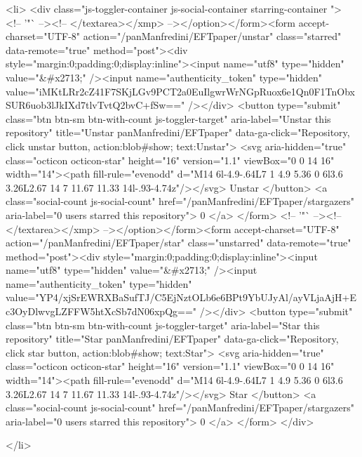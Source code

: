   <li>
      <div class="js-toggler-container js-social-container starring-container ">
    <!-- '"` --><!-- </textarea></xmp> --></option></form><form accept-charset="UTF-8" action="/panManfredini/EFTpaper/unstar" class="starred" data-remote="true" method="post"><div style="margin:0;padding:0;display:inline"><input name="utf8" type="hidden" value="&#x2713;" /><input name="authenticity_token" type="hidden" value="iMKtLRr2cZ41F7SKjLGv9PCT2a0EuIlgwrWrNGpRuox6e1Qn0F1TnObxSUR6uob3lJkIXd7tlvTvtQ2bvC+fSw==" /></div>
      <button
        type="submit"
        class="btn btn-sm btn-with-count js-toggler-target"
        aria-label="Unstar this repository" title="Unstar panManfredini/EFTpaper"
        data-ga-click="Repository, click unstar button, action:blob#show; text:Unstar">
        <svg aria-hidden="true" class="octicon octicon-star" height="16" version="1.1" viewBox="0 0 14 16" width="14"><path fill-rule="evenodd" d="M14 6l-4.9-.64L7 1 4.9 5.36 0 6l3.6 3.26L2.67 14 7 11.67 11.33 14l-.93-4.74z"/></svg>
        Unstar
      </button>
        <a class="social-count js-social-count" href="/panManfredini/EFTpaper/stargazers"
           aria-label="0 users starred this repository">
          0
        </a>
</form>
    <!-- '"` --><!-- </textarea></xmp> --></option></form><form accept-charset="UTF-8" action="/panManfredini/EFTpaper/star" class="unstarred" data-remote="true" method="post"><div style="margin:0;padding:0;display:inline"><input name="utf8" type="hidden" value="&#x2713;" /><input name="authenticity_token" type="hidden" value="YP4/xjSrEWRXBaSufTJ/C5EjNztOLb6e6BPt9YbUJyAl/ayVLjaAjH+Ec3OyDlwvgLZFFW5htXcSb7dN06xpQg==" /></div>
      <button
        type="submit"
        class="btn btn-sm btn-with-count js-toggler-target"
        aria-label="Star this repository" title="Star panManfredini/EFTpaper"
        data-ga-click="Repository, click star button, action:blob#show; text:Star">
        <svg aria-hidden="true" class="octicon octicon-star" height="16" version="1.1" viewBox="0 0 14 16" width="14"><path fill-rule="evenodd" d="M14 6l-4.9-.64L7 1 4.9 5.36 0 6l3.6 3.26L2.67 14 7 11.67 11.33 14l-.93-4.74z"/></svg>
        Star
      </button>
        <a class="social-count js-social-count" href="/panManfredini/EFTpaper/stargazers"
           aria-label="0 users starred this repository">
          0
        </a>
</form>  </div>

  </li>

